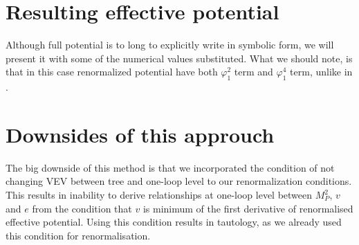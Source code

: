 \section{Resulting effective potential}\label{finitemomentumissue}
Although full potential is to long to explicitly write in symbolic form, we 
will present it with some of the numerical values substituted. 
What we should note, is that in this case renormalized potential have both $\varphi_1^2$ term 
and $\varphi_1^4$ term, unlike in \cite{Coleman1973}. \\

\section{Downsides of this approuch}
The big downside of this method is that we incorporated the condition of not changing VEV between 
tree and one-loop level to our renormalization conditions. This results in inability to 
derive relationships at one-loop level between $M_P^2$, $v$ and $e$ from the condition that 
$v$ is minimum of the first derivative of renormalised effective potential. Using this 
condition results in tautology, as we already used this condition for renormalisation. 
